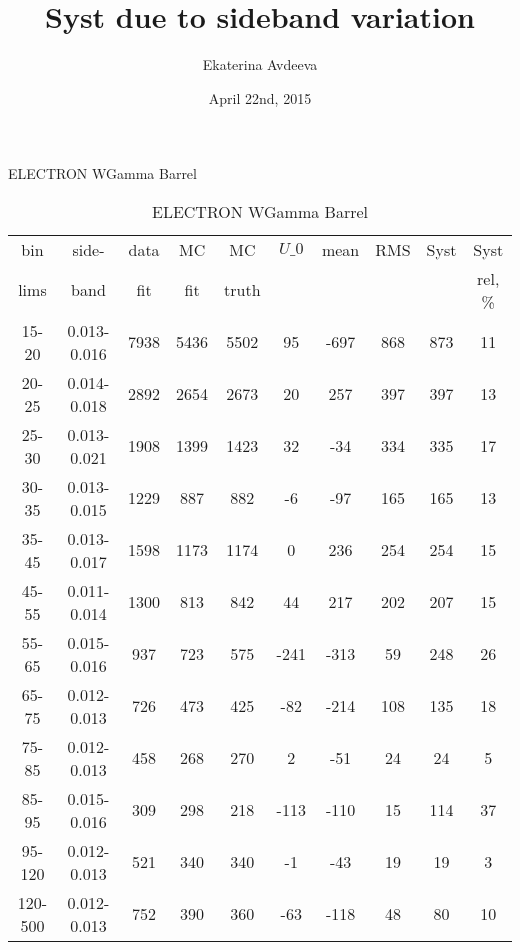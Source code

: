 \documentclass{beamer}
\title{Syst due to sideband variation}
\author{Ekaterina Avdeeva}
\institute{University of Nebraska - Lincoln}
\date{April 22nd, 2015}
\begin{document}
\begin{frame}
\titlepage
\end{frame}

\begin{frame}{ELECTRON WGamma Barrel}
{

\begin{table}[h]
  \scriptsize
  \begin{center}
  \caption{ELECTRON WGamma Barrel}
  \begin{tabular}{|c|c|c|c|c|c|c|c|c|c|}
    bin & side- & data & MC & MC    & $U\_{0}$ & mean & RMS & Syst & Syst \\ 
    lims & band & fit & fit & truth &       &      &     &      & rel, \% \\ \hline
    15-20 & 0.013-0.016 & 7938 & 5436 & 5502 & 95 & -697 & 868 & 873 & 11  \\ \hline
    20-25 & 0.014-0.018 & 2892 & 2654 & 2673 & 20 & 257 & 397 & 397 & 13  \\ \hline
    25-30 & 0.013-0.021 & 1908 & 1399 & 1423 & 32 & -34 & 334 & 335 & 17  \\ \hline
    30-35 & 0.013-0.015 & 1229 & 887 & 882 & -6 & -97 & 165 & 165 & 13  \\ \hline
    35-45 & 0.013-0.017 & 1598 & 1173 & 1174 & 0 & 236 & 254 & 254 & 15  \\ \hline
    45-55 & 0.011-0.014 & 1300 & 813 & 842 & 44 & 217 & 202 & 207 & 15  \\ \hline
    55-65 & 0.015-0.016 & 937 & 723 & 575 & -241 & -313 & 59 & 248 & 26  \\ \hline
    65-75 & 0.012-0.013 & 726 & 473 & 425 & -82 & -214 & 108 & 135 & 18  \\ \hline
    75-85 & 0.012-0.013 & 458 & 268 & 270 & 2 & -51 & 24 & 24 & 5  \\ \hline
    85-95 & 0.015-0.016 & 309 & 298 & 218 & -113 & -110 & 15 & 114 & 37  \\ \hline
    95-120 & 0.012-0.013 & 521 & 340 & 340 & -1 & -43 & 19 & 19 & 3  \\ \hline
    120-500 & 0.012-0.013 & 752 & 390 & 360 & -63 & -118 & 48 & 80 & 10  \\ \hline
  \end{tabular}
  \label{tab:systSbVar_Meth1_ELECTRON_WGamma_Barrel}
  \end{center}
\end{table}



}
\end{frame}
\end{document}

